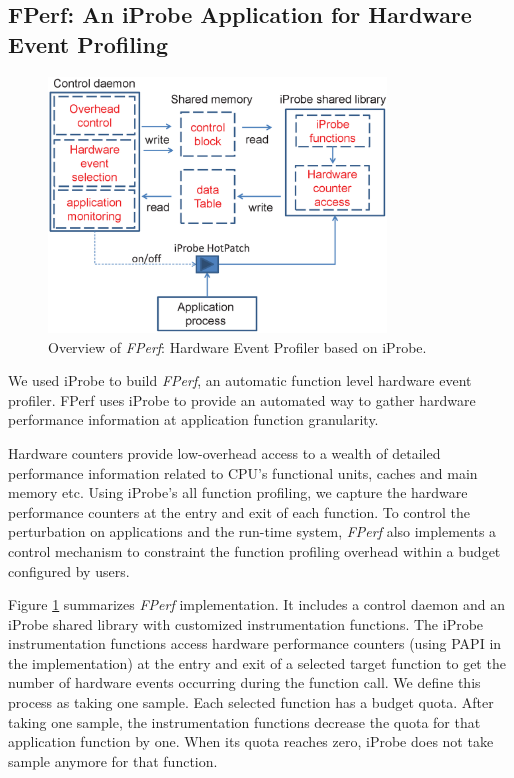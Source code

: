 \subsection{FPerf: An iProbe Application for Hardware Event Profiling}
\label{sec:imp:configure}


\begin{figure}[t]
    \begin{center}
      \includegraphics[width=0.8\textwidth]{iprobe/Images/sysdesign2.eps}
      \caption{Overview of \textit{FPerf}: Hardware Event Profiler based on iProbe.}
      \label{fig:implement}
    \end{center}
\end{figure}

We used iProbe to build \emph{FPerf}, an automatic function level hardware event profiler.  
FPerf uses iProbe to provide an automated way to gather hardware performance information at 
application function granularity.

Hardware counters provide low-overhead access to a wealth of detailed performance information related to CPU's functional units, caches and main memory etc.
Using iProbe's all function profiling, we capture the hardware performance counters at the entry and exit of each function.
To control the perturbation on applications and the run-time system, \textit{FPerf} also implements a control mechanism to constraint the function profiling overhead within a budget configured by users.

Figure \ref{fig:implement} summarizes \textit{FPerf} implementation. 
It includes a control daemon and an iProbe shared library with customized instrumentation functions. 
The iProbe instrumentation functions access hardware performance counters (using PAPI\cite{papi} in the implementation) at the entry and exit of a selected target function to get the number of hardware events occurring during the function call. 
We define this process as taking one sample. 
Each selected function has a budget quota.
After taking one sample, the instrumentation functions decrease the quota for that application function by one. 
When its quota reaches zero, iProbe does not take sample anymore for that function.


